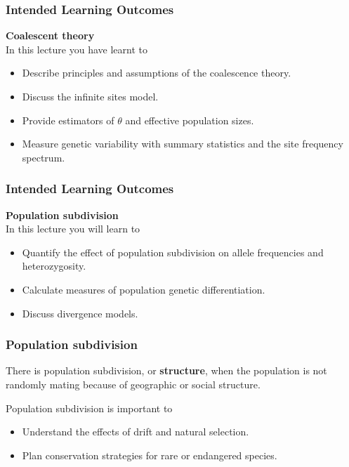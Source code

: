 \documentclass{beamer}
\newcommand{\1}{\ensuremath{\mathbf{1}}}
\begin{document}
%
%
%
\begin{frame}\frametitle{Intended Learning Outcomes}
	\textbf{Coalescent theory}\\[2ex]
	In this lecture you have learnt to
	\begin{itemize}
		\item Describe principles and assumptions of the coalescence theory.
		\item Discuss the infinite sites model.
		\item Provide estimators of $\theta$ and effective population sizes.
		\item Measure genetic variability with summary statistics and the site frequency spectrum.
	\end{itemize}
\end{frame}
%
%
%
\begin{frame}\frametitle{Intended Learning Outcomes}
	\textbf{Population subdivision}\\[2ex]
	In this lecture you will learn to
	\begin{itemize}
		\item Quantify the effect of population subdivision on allele frequencies and heterozygosity.
		\item Calculate measures of population genetic differentiation.
		\item Discuss divergence models.
	\end{itemize}
\end{frame}
%
%
%
\begin{frame}\frametitle{Population subdivision}
	\begin{block}{}
		There is population subdivision, or \textbf{structure}, when the population is not randomly mating because of geographic or social structure.
	\end{block}
	Population subdivision is important to
	\begin{itemize}
		\item Understand the effects of drift and natural selection.
		\item Plan conservation strategies for rare or endangered species.
	\end{itemize}
\end{frame}
\end{document}
